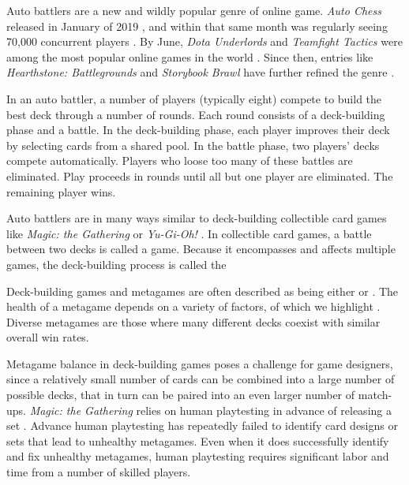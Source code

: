 
Auto battlers are a new and wildly popular genre of online game.
\textit{Auto Chess} released in January of 2019 \cite{autochess}, and
within that same month was regularly seeing 70,000 concurrent players
\cite{auto-chess-what-and-why}. By June, \textit{Dota Underlords} and
\textit{Teamfight Tactics} were among the most popular online games in
the world \cite{autobattler-popularity}. Since then, entries like
\textit{Hearthstone: Battlegrounds} and \textit{Storybook Brawl} have
further refined the genre \cite{hearthstone-battlegrounds,
storybook-brawl}.



In an auto battler, a number of players (typically eight) compete to
build the best deck through a number of rounds. Each round consists of
a deck-building phase and a battle. In the deck-building phase, each
player improves their deck by selecting cards from a shared pool. In
the battle phase, two players' decks compete automatically. Players
who loose too many of these battles are eliminated. Play proceeds in
rounds until all but one player are eliminated. The remaining player
wins.

Auto battlers are in many ways similar to deck-building collectible
card games like \textit{Magic: the Gathering} or \textit{Yu-Gi-Oh!}
\cite{magic-the-gathering, yugioh-tcg}. In collectible card games, a
battle between two decks is called a game. Because it encompasses and
affects multiple games, the deck-building process is called the

Deck-building games and metagames are often described as being either
 or . The health of a metagame
depends on a variety of factors, of which we highlight
. Diverse metagames are those where many different
decks coexist with similar overall win rates.

Metagame balance in deck-building games poses a challenge for game
designers, since a relatively small number of cards can be combined
into a large number of possible decks, that in turn can be paired
into an even larger number of match-ups. \textit{Magic: the Gathering}
relies on human playtesting in advance of releasing a set
\cite{designing-hod-ffl}. Advance human playtesting has repeatedly
failed to identify card designs or sets that lead to unhealthy
metagames. Even when it does successfully identify and fix unhealthy
metagames, human playtesting requires significant labor and time from
a number of skilled players.

